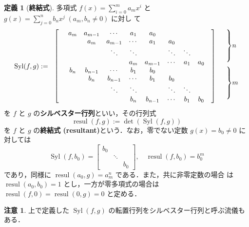 \documentclass[12pt, uplatex, dvipdfmx]{jsarticle}
\newcommand{\ds}{\displaystyle}
\theoremstyle{definition}
\newtheorem*{definition}{定義}
\newtheorem*{remark}{注意}
\DeclareMathOperator{\Syl}{Syl}
\DeclareMathOperator{\resul}{resul}
\begin{document}
\begin{definition}[\textbf{終結式}]
  多項式 $\ds f(x) = \sum_{i=0}^{m}a_m x^i$ と $\ds g(x) = \sum_{j=0}^{n} b_n x^j \; (a_m, b_n \neq 0)$ に対し
  て
  \[
    \Syl(f,g):=
    \begin{array}{rccccccccll}
      \ldelim[{9}{12pt}[] &  a_m & a_{m-1} & \cdots & a_1 & a_0 & & & & \rdelim]{9}{12pt}[] & \rdelim\}{4}{14pt}[\(n\)]\\
                          &  & a_m & a_{m-1} & \cdots & a_1 & a_0& & & &\\
                          &  & & \ddots & \ddots & & \ddots & \ddots & & & \\
                          &  & & & a_m & a_{m-1} & \cdots & a_1 & a_0 & &\\
                          & b_n & b_{n-1} & \cdots & b_1 & b_0 & & & & &  \rdelim\}{4}{14pt}[\(m\)]\\
                          & & b_n & b_{n-1} & \cdots & b_1 & b_0 & & & & \\
                          & & & \ddots & \ddots & & \ddots & \ddots & & &\\
                          & & & & b_n & b_{n-1} & \cdots & b_1 & b_0 & &
    \end{array}
  \]
  を $f$ と $g$ の\textbf{シルベスター行列}といい，その行列式
  \[
    \resul(f,g):= \det(\Syl(f,g))
  \]
  を $f$ と $g$ の\textbf{終結式 (resultant)}という．なお，零でない定数 $g(x) = b_0 \neq 0$ に対しては
  \[
    \Syl(f, b_0) =\left[
    \begin{array}{ccc}
       b_0  & & \\
            & \ddots & \\
            & & b_0 
    \end{array}
  \right], \quad \resul(f, b_0) = b_0^m
  \]
  であり，同様に $\resul(a_0, g) = a_m^n$ である．また，共に非零定数の場合
  は $\resul(a_0, b_0)=1$ とし，一方が零多項式の場合は $\resul(f,0) =
  \resul(0,g)=0$ と定める．
\end{definition}

\begin{remark}
  上で定義した $\Syl(f,g)$ の転置行列をシルベスター行列と呼ぶ流儀もある．
\end{remark}
\end{document}
